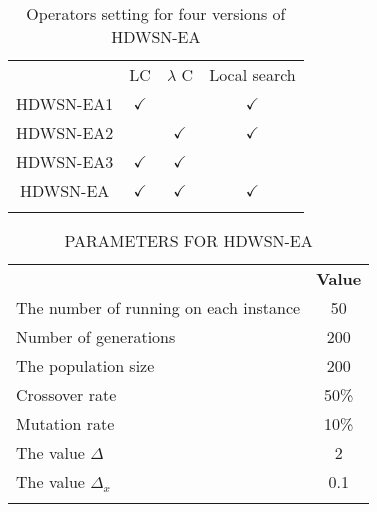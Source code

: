 \begin{table}
\caption{Operators setting for four versions of HDWSN-EA}
\label{tab14}       %
\begin{center}
\renewcommand{\arraystretch}{1.5}
	\resizebox{\textwidth}{!} {
\begin{tabular}{cccc}
\hline\noalign{\smallskip}
	&	LC 	&	$\lambda$ C 	&	Local search	\\
\noalign{\smallskip}\hline\noalign{\smallskip}
HDWSN-EA1	&$\checkmark$	&		&$\checkmark$		\\
HDWSN-EA2	&		&	$\checkmark$	& $\checkmark$		\\
HDWSN-EA3	&	$\checkmark$		&		$\checkmark$	&	\\
HDWSN-EA	&	$\checkmark$	&	$\checkmark$	&	$\checkmark$	\\
\noalign{\smallskip} \hline
\end{tabular}}
\end{center}
\end{table}

\begin{table}
	\caption{PARAMETERS FOR HDWSN-EA}
	\label{tab14}       %
	\begin{center}
		\renewcommand{\arraystretch}{1.5}
		\resizebox{\textwidth}{!} {
			\begin{tabular}{lc}
				\hline\noalign{\smallskip}
					\multicolumn{1}{c}{\textbf{Parameter}} & \textbf{Value} \\
				\noalign{\smallskip}\hline\noalign{\smallskip}
					The number of running on each instance & 50 \\
					Number of generations & 200
\\
					The population size & 200
\\
					Crossover rate & 50\% \\

					Mutation rate & 10\% \\

					The value $\Delta$ & 2 \\
					The value $\Delta_x$ & 0.1 \\ 
				\noalign{\smallskip} \hline
		\end{tabular}}
	\end{center}
\end{table}
